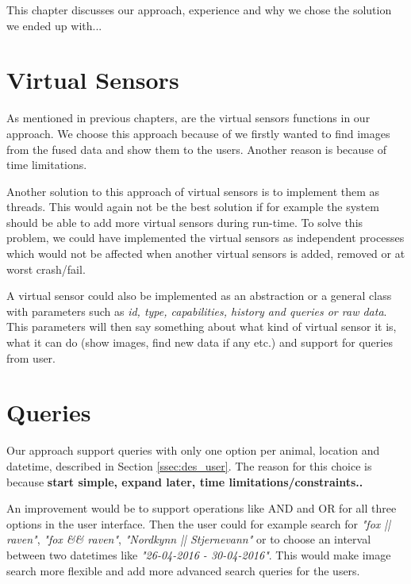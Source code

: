 \documentclass[USenglish]{uit-thesis}
\begin{document}
This chapter discusses our approach, experience and why we chose the solution we ended up with...

\section{Virtual Sensors}
As mentioned in previous chapters, are the virtual sensors functions in our approach. We choose this approach because of we firstly wanted to find images from the fused data and show them to the users. Another reason is because of time limitations.

Another solution to this approach of virtual sensors is to implement them as threads. This would again not be the best solution if for example the system should be able to add more virtual sensors during run-time. To solve this problem, we could have implemented the virtual sensors as independent processes which would not be affected when another virtual sensors is added, removed or at worst crash/fail.

A virtual sensor could also be implemented as an abstraction or a general class with parameters such as \textit{id, type, capabilities, history and queries or raw data}. This parameters will then say something about what kind of virtual sensor it is, what it can do (show images, find new data if any etc.) and support for queries from user.

\section{Queries}
Our approach support queries with only one option per animal, location and datetime, described in Section \ref{ssec:des_user}. The reason for this choice is because \textbf{start simple, expand later, time limitations/constraints..}

An improvement would be to support operations like AND and OR for all three options in the user interface.
Then the user could for example search for \textit{"fox || raven"}, \textit{"fox \&\& raven"}, \textit{"Nordkynn || Stjernevann"} or to choose an interval between two datetimes like \textit{"26-04-2016 - 30-04-2016"}. This would make image search more flexible and add more advanced search queries for the users.
\end{document}
